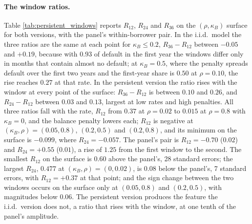 \paragraph{The window ratios.} Table \ref{tab:persistent_windows} reports $R_{12}$, $R_{24}$ and $R_{36}$ on the $(\rho, \kappa_B)$ surface for both versions, with the panel's within-borrower pair. In the i.i.d.\ model the three ratios are the same at each point for $\kappa_B \le 0.2$, $R_{36} - R_{12}$ between $-0.05$ and $+0.19$, because with $0.93$ of default in the first year the windows differ only in months that contain almost no default; at $\kappa_B = 0.5$, where the penalty spreads default over the first two years and the first-year share is $0.50$ at $\rho = 0.10$, the rise reaches $0.27$ at that rate. In the persistent version the ratio rises with the window at every point of the surface: $R_{36} - R_{12}$ is between $0.10$ and $0.26$, and $R_{24} - R_{12}$ between $0.03$ and $0.13$, largest at low rates and high penalties. All three ratios fall with the rate, $R_{12}$ from $0.37$ at $\rho = 0.02$ to $0.015$ at $\rho = 0.8$ with $\kappa_B = 0$, and the balance penalty lowers each; $R_{12}$ is negative at $(\kappa_B, \rho) = (0.05, 0.8)$, $(0.2, 0.5)$ and $(0.2, 0.8)$, and its minimum on the surface is $-0.099$, where $R_{24} = -0.057$. The panel's pair is $R_{12} = -0.70$ ($0.02$) and $R_{24} = +0.55$ ($0.01$), a rise of $1.25$ from the first window to the second. The smallest $R_{12}$ on the surface is $0.60$ above the panel's, 28 standard errors; the largest $R_{24}$, $0.477$ at $(\kappa_B, \rho) = (0, 0.02)$, is $0.08$ below the panel's, 7 standard errors, with $R_{12} = +0.37$ at that point; and the sign change between the two windows occurs on the surface only at $(0.05, 0.8)$ and $(0.2, 0.5)$, with magnitudes below $0.06$. The persistent version produces the feature the i.i.d.\ version does not, a ratio that rises with the window, at one tenth of the panel's amplitude.

